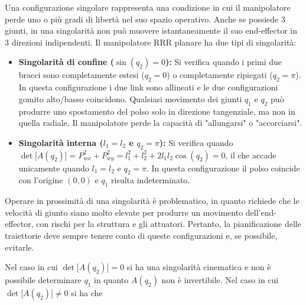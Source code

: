 \documentclass[11pt, a4paper]{article}
\begin{document}
\begin{par}
\begin{flushleft}
Una configurazione singolare rappresenta una condizione in cui il manipolatore perde uno o più gradi di libertà nel suo spazio operativo. Anche se possiede 3 giunti, in una singolarità non può muovere istantaneamente il suo end-effector in 3 direzioni indipendenti. Il manipolatore RRR planare ha due tipi di singolarità:
\end{flushleft}
\end{par}

\begin{itemize}
   \item{\begin{flushleft} \textbf{Singolarità di confine ($\sin(q_2)=0$):} Si verifica quando i primi due bracci sono completamente estesi ($q_2 =0$) o completamente ripiegati ($q_2 =\pi$). In questa configurazione i due link sono allineati e le due configurazioni gomito alto/basso coincidono. Qualsiasi movimento dei giunti $q_1$ e $q_2$ può produrre uno spostamento del polso solo in direzione tangenziale, ma non in quella radiale. Il manipolatore perde la capacità di "allungarsi" o "accorciarsi". \end{flushleft}}
   \item{\begin{flushleft} \textbf{Singolarità interna ($l_1 = l_2$ e $q_2 = \pi$):} Si verifica quando $\det\bigl\lbrack A(q_2)\bigr\rbrack = P_{wx}^2 + P_{wy}^2 = l_1^2 + l_2^2 + 2l_1 l_2 \cos(q_2) = 0$, il che accade unicamente quando $l_1 = l_2$ e $q_2 = \pi$. In questa configurazione il polso coincide con l'origine $(0,0)$ e $q_1$ risulta indeterminato. \end{flushleft}}
\end{itemize}
\newpage
\begin{par}
\begin{flushleft}
Operare in prossimità di una singolarità è problematico, in quanto richiede che le velocità di giunto siano molto elevate per produrre un movimento dell'end-effector, con rischi per la struttura e gli attuatori. Pertanto, la pianificazione delle traiettorie deve sempre tenere conto di queste configurazioni e, se possibile, evitarle.
\end{flushleft}
\end{par}

\begin{par}
\begin{flushleft}
Nel caso in cui $\det \bigl\lbrack A(q_2 )\bigr\rbrack =0$ si ha una singolarità cinematica e non è possibile determinare $q_1$ in quanto $A(q_2 )$ non è invertibile. Nel caso in cui $\det\bigl\lbrack A(q_2 )\bigr\rbrack \not= 0$ si ha che
\end{flushleft}
\end{par}
\end{document}
